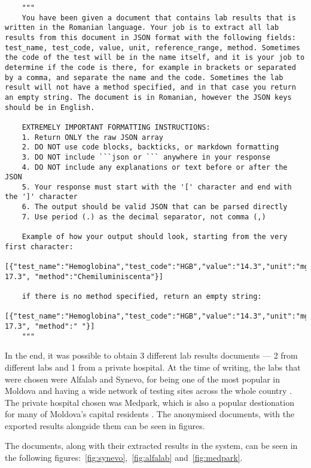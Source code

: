 \begin{lstlisting}
    """
    You have been given a document that contains lab results that is written in the Romanian language. Your job is to extract all lab results from this document in JSON format with the following fields: test_name, test_code, value, unit, reference_range, method. Sometimes the code of the test will be in the name itself, and it is your job to determine if the code is there, for example in brackets or separated by a comma, and separate the name and the code. Sometimes the lab result will not have a method specified, and in that case you return an empty string. The document is in Romanian, however the JSON keys should be in English.

    EXTREMELY IMPORTANT FORMATTING INSTRUCTIONS:
    1. Return ONLY the raw JSON array
    2. DO NOT use code blocks, backticks, or markdown formatting
    3. DO NOT include ```json or ``` anywhere in your response
    4. DO NOT include any explanations or text before or after the JSON
    5. Your response must start with the '[' character and end with the ']' character
    6. The output should be valid JSON that can be parsed directly
    7. Use period (.) as the decimal separator, not comma (,)

    Example of how your output should look, starting from the very first character:
    [{"test_name":"Hemoglobina","test_code":"HGB","value":"14.3","unit":"mg/dL","reference_range":"13.2-17.3", "method":"Chemiluminiscenta"}]

    if there is no method specified, return an empty string:
    [{"test_name":"Hemoglobina","test_code":"HGB","value":"14.3","unit":"mg/dL","reference_range":"13.2-17.3", "method":" "}]
    """
\end{lstlisting}

In the end, it was possible to obtain 3 different lab results documents --- 2 from different labs and 1 from a private hospital. At the time of writing, the labs that were chosen were Alfalab and Synevo, for being one of the most popular in Moldova and having a wide network of testing sites across the whole country \parencite{alfalab, synevo}. The private hospital chosen was Medpark, which is also a popular destionation for many of Moldova's capital residents \parencite{medpark}. The anonymised documents, with the exported results alongside them can be seen in figures.

The documents, along with their extracted results in the system, can be seen in the following figures:~\ref{fig:synevo},~\ref{fig:alfalab} and~\ref{fig:medpark}.


